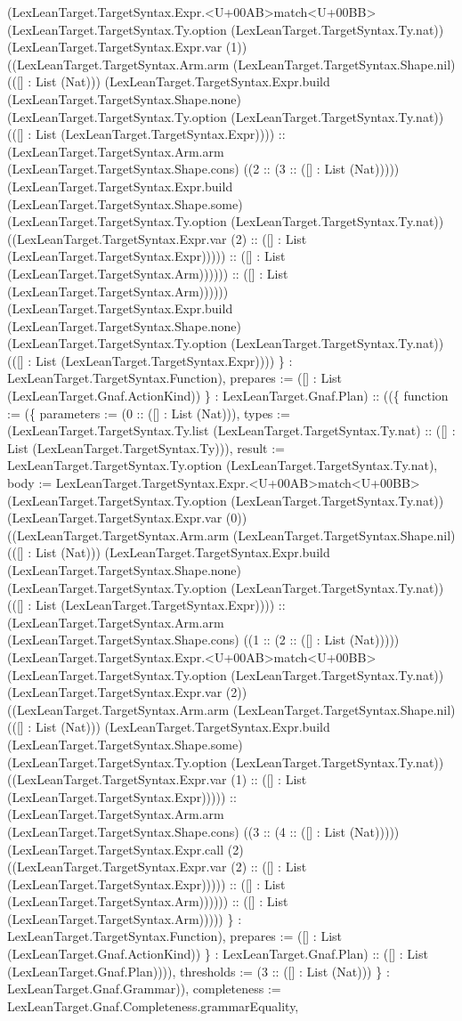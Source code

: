 \documentclass[11pt]{article}
\begin{document}
(LexLeanTarget.TargetSyntax.Expr.<U+00AB>match<U+00BB> (LexLeanTarget.TargetSyntax.Ty.option (LexLeanTarget.TargetSyntax.Ty.nat)) (LexLeanTarget.TargetSyntax.Expr.var (1)) ((LexLeanTarget.TargetSyntax.Arm.arm (LexLeanTarget.TargetSyntax.Shape.nil) (([] : List (Nat))) (LexLeanTarget.TargetSyntax.Expr.build (LexLeanTarget.TargetSyntax.Shape.none) (LexLeanTarget.TargetSyntax.Ty.option (LexLeanTarget.TargetSyntax.Ty.nat)) (([] : List (LexLeanTarget.TargetSyntax.Expr)))) :: (LexLeanTarget.TargetSyntax.Arm.arm (LexLeanTarget.TargetSyntax.Shape.cons) ((2 :: (3 :: ([] : List (Nat))))) (LexLeanTarget.TargetSyntax.Expr.build (LexLeanTarget.TargetSyntax.Shape.some) (LexLeanTarget.TargetSyntax.Ty.option (LexLeanTarget.TargetSyntax.Ty.nat)) ((LexLeanTarget.TargetSyntax.Expr.var (2) :: ([] : List (LexLeanTarget.TargetSyntax.Expr))))) :: ([] : List (LexLeanTarget.TargetSyntax.Arm)))))) :: ([] : List (LexLeanTarget.TargetSyntax.Arm)))))) (LexLeanTarget.TargetSyntax.Expr.build (LexLeanTarget.TargetSyntax.Shape.none) (LexLeanTarget.TargetSyntax.Ty.option (LexLeanTarget.TargetSyntax.Ty.nat)) (([] : List (LexLeanTarget.TargetSyntax.Expr)))) \} : LexLeanTarget.TargetSyntax.Function), prepares := ([] : List (LexLeanTarget.Gnaf.ActionKind)) \} : LexLeanTarget.Gnaf.Plan) :: ((\{ function := (\{ parameters := (0 :: ([] : List (Nat))), types := (LexLeanTarget.TargetSyntax.Ty.list (LexLeanTarget.TargetSyntax.Ty.nat) :: ([] : List (LexLeanTarget.TargetSyntax.Ty))), result := LexLeanTarget.TargetSyntax.Ty.option (LexLeanTarget.TargetSyntax.Ty.nat), body := LexLeanTarget.TargetSyntax.Expr.<U+00AB>match<U+00BB> (LexLeanTarget.TargetSyntax.Ty.option (LexLeanTarget.TargetSyntax.Ty.nat)) (LexLeanTarget.TargetSyntax.Expr.var (0)) ((LexLeanTarget.TargetSyntax.Arm.arm (LexLeanTarget.TargetSyntax.Shape.nil) (([] : List (Nat))) (LexLeanTarget.TargetSyntax.Expr.build (LexLeanTarget.TargetSyntax.Shape.none) (LexLeanTarget.TargetSyntax.Ty.option (LexLeanTarget.TargetSyntax.Ty.nat)) (([] : List (LexLeanTarget.TargetSyntax.Expr)))) :: (LexLeanTarget.TargetSyntax.Arm.arm (LexLeanTarget.TargetSyntax.Shape.cons) ((1 :: (2 :: ([] : List (Nat))))) (LexLeanTarget.TargetSyntax.Expr.<U+00AB>match<U+00BB> (LexLeanTarget.TargetSyntax.Ty.option (LexLeanTarget.TargetSyntax.Ty.nat)) (LexLeanTarget.TargetSyntax.Expr.var (2)) ((LexLeanTarget.TargetSyntax.Arm.arm (LexLeanTarget.TargetSyntax.Shape.nil) (([] : List (Nat))) (LexLeanTarget.TargetSyntax.Expr.build (LexLeanTarget.TargetSyntax.Shape.some) (LexLeanTarget.TargetSyntax.Ty.option (LexLeanTarget.TargetSyntax.Ty.nat)) ((LexLeanTarget.TargetSyntax.Expr.var (1) :: ([] : List (LexLeanTarget.TargetSyntax.Expr))))) :: (LexLeanTarget.TargetSyntax.Arm.arm (LexLeanTarget.TargetSyntax.Shape.cons) ((3 :: (4 :: ([] : List (Nat))))) (LexLeanTarget.TargetSyntax.Expr.call (2) ((LexLeanTarget.TargetSyntax.Expr.var (2) :: ([] : List (LexLeanTarget.TargetSyntax.Expr))))) :: ([] : List (LexLeanTarget.TargetSyntax.Arm)))))) :: ([] : List (LexLeanTarget.TargetSyntax.Arm))))) \} : LexLeanTarget.TargetSyntax.Function), prepares := ([] : List (LexLeanTarget.Gnaf.ActionKind)) \} : LexLeanTarget.Gnaf.Plan) :: ([] : List (LexLeanTarget.Gnaf.Plan)))), thresholds := (3 :: ([] : List (Nat))) \} : LexLeanTarget.Gnaf.Grammar)), completeness := LexLeanTarget.Gnaf.Completeness.grammarEquality, 
\end{document}
